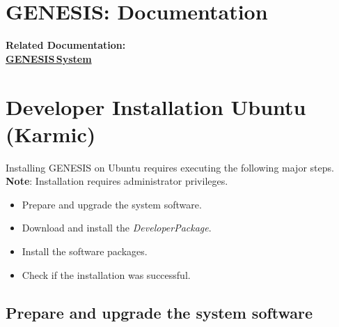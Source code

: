 \documentclass[12pt]{article}
\begin{document}
\section*{GENESIS: Documentation}

{\bf Related Documentation:} \\
\href{../genesis-system/genesis-system.tex}{\bf GENESIS\,System}

\section*{Developer Installation Ubuntu (Karmic)}

Installing GENESIS on Ubuntu requires executing the following major steps. {\bf Note}: Installation requires administrator privileges.
\begin{itemize}
   \item[] Prepare and upgrade the system software.
   \item[] Download and install the {\it DeveloperPackage}.
   \item[] Install the software packages.
   \item[] Check if the installation was successful. 
\end{itemize}

\subsection*{Prepare and upgrade the system software}
\end{document}
